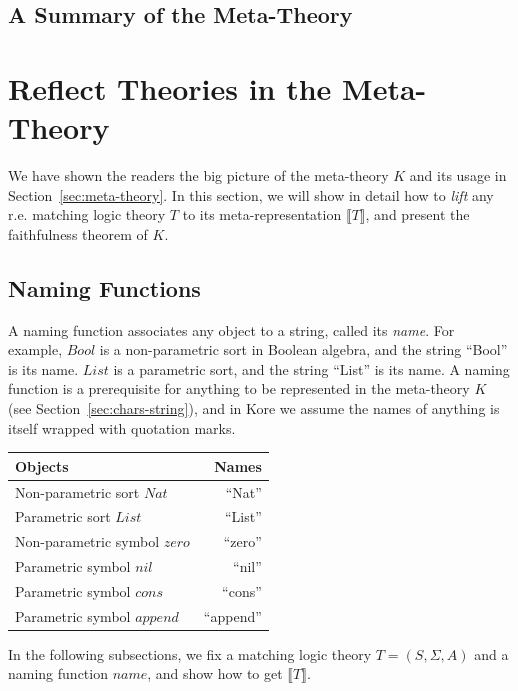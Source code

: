 \documentclass[UTF8,11pt]{article}
\theoremstyle{plain}
\theoremstyle{definition}
\theoremstyle{remark}
\newcommand{\Nat}{\textit{Nat}}
\newcommand{\Bool}{\textit{Bool}}
\newcommand{\List}{\textit{List}}
\newcommand{\nil}{\textit{nil}}
\newcommand{\cons}{\textit{cons}}
\newcommand{\append}{\textit{append}}
\newcommand{\zero}{\textit{zero}}
\newcommand{\denote}[1]{\llbracket{#1}\rrbracket}
\newcommand{\name}{\mathit{name}}
\begin{document}
\subsection{A Summary of the Meta-Theory}
\label{sec:K-summary}

\section{Reflect Theories in the Meta-Theory}
\label{sec:reflect}
We have shown the readers the big picture of the meta-theory $K$ and its usage in Section~\cref{sec:meta-theory}.
In this section, we will show in detail how to \emph{lift} any r.e. matching logic theory $T$ to its meta-representation $\denote{T}$, and present the faithfulness theorem of $K$.

\subsection{Naming Functions}
A naming function associates any object to a string, called its \emph{name}.
For example, $\Bool$ is a non-parametric sort in Boolean algebra, and the string ``Bool'' is its name.
$\List$ is a parametric sort, and the string ``List'' is its name.
A naming function is a prerequisite for anything to be represented in the meta-theory $K$ (see Section~\cref{sec:chars-string}), and in Kore we assume the names of anything is itself wrapped with quotation marks.

\begin{center}
	\begin{tabular}{l|r}
		\textbf{Objects} & \textbf{Names}
		\\\hline
		Non-parametric sort $\Nat$ & ``Nat''
		\\\hline
		Parametric sort $\List$ & ``List''
		\\\hline
		Non-parametric symbol $\zero$ & ``zero''
		\\\hline
		Parametric symbol $\nil$ & ``nil''
		\\\hline
		Parametric symbol $\cons$ & ``cons''
		\\\hline
		Parametric symbol $\append$ & ``append''
	\end{tabular}
\end{center}

In the following subsections, we fix a matching logic theory $T = (S, \Sigma, A)$ and a naming function $\name$, and show how to get $\denote{T}$.
\end{document}
